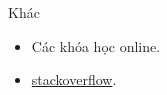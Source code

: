 \documentclass[11pt]{beamer}
\begin{document}
  \begin{frame}{Khác}
    \begin{itemize}
      \item Các khóa học online.
      \item \href{https://stackoverflow.com/questions/tagged/python}{stackoverflow}.
    \end{itemize}
  \end{frame}
\end{document}

